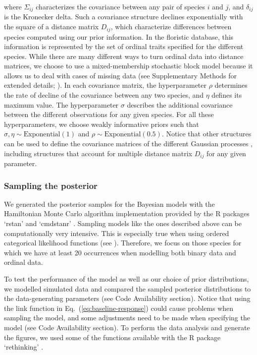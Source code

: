 \documentclass[11pt, a4paper]{article}
\begin{document}
where $\Sigma_{ij}$ characterizes the covariance between any pair of species $i$ and $j$, and $\delta_{ij}$ is the Kronecker delta. Such a covariance structure declines exponentially with the square of a distance matrix $D_{ij}$, which characterize differences between species computed using our prior information. In the floristic database, this information is represented by the set of ordinal traits specified for the different species. While there are many different ways to turn ordinal data into distance matrices, we choose to use a mixed-membership stochastic block model because it allows us to deal with cases of missing data (see Supplementary Methods for extended details; \citealt{godoy-loriteAccurateScalableSocial2016}). In each covariance matrix, the hyperparameter $\rho$ determines the rate of decline of the covariance between any two species, and $\eta$ defines its maximum value. The hyperparameter $\sigma$ describes the additional covariance between the different observations for any given species. For all these hyperparameters, we choose weakly informative priors such that $\sigma , \eta \sim \text{Exponential}\left(1\right)$ and $\rho\sim \text{Exponential}\left(0.5\right)$. Notice that other structures can be used to define the covariance matrices of the different Gaussian processes \citep{mcelreathStatisticalRethinkingBayesian2020}, including structures that account for multiple distance matrix $D_{ij}$ for any given parameter.

\subsubsection*{Sampling the posterior}
We generated the posterior samples for the Bayesian models with the Hamiltonian Monte Carlo algorithm implementation provided by the R packages `rstan' and `cmdstanr' \citep{standevelopentteamRStanInterfaceStan2021}. Sampling models like the ones described above can be computationally very intensive. This is especially true when using ordered categorical likelihood functions (see \citealt{standevelopmentteamStanModelingLanguage2021}). Therefore, we focus on those species for which we have at least 20 occurrences when modelling both binary data and ordinal data.

To test the performance of the model as well as our choice of prior distributions, we modelled simulated data and compared the sampled posterior distributions to the data-generating parameters (see Code Availability section). Notice that using the link function in Eq.~(\ref{eq:baseline-response}) could cause problems when sampling the model, and some adjustments need to be made when specifying the model (see Code Availability section). To perform the data analysis and generate the figures, we used some of the functions available with the R package `rethinking' \citep{mcelreathStatisticalRethinkingBayesian2020}.
\end{document}

